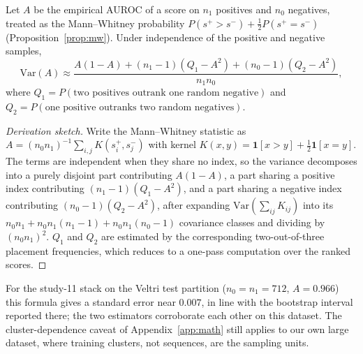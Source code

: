 \begin{proposition}\label{prop:hm}
Let $A$ be the empirical AUROC of a score on $n_1$ positives and $n_0$
negatives, treated as the Mann--Whitney probability
$P(s^{+} > s^{-}) + \tfrac12 P(s^{+} = s^{-})$
(Proposition~\ref{prop:mw}). Under independence of the positive and
negative samples,
\begin{equation}
\mathrm{Var}(A) \approx
\frac{A(1-A) + (n_1 - 1)(Q_1 - A^2) + (n_0 - 1)(Q_2 - A^2)}{n_1 n_0},
\label{eq:hmvar}
\end{equation}
where $Q_1 = P(\text{two positives outrank one random negative})$ and
$Q_2 = P(\text{one positive outranks two random negatives})$.
\end{proposition}
\begin{proof}[Derivation sketch]
Write the Mann--Whitney statistic as
$A = (n_0 n_1)^{-1}\sum_{i,j} K(s_i^{+}, s_j^{-})$ with kernel
$K(x,y) = \mathbf 1[x>y] + \tfrac12 \mathbf 1[x=y]$. The terms are
independent when they share no index, so the variance decomposes into a
purely disjoint part contributing $A(1-A)$, a part sharing a positive
index contributing $(n_1-1)(Q_1 - A^2)$, and a part sharing a negative
index contributing $(n_0-1)(Q_2 - A^2)$, after expanding
$\mathrm{Var}(\sum_{ij} K_{ij})$ into its $n_0n_1 + n_0n_1(n_1-1) +
n_0n_1(n_0-1)$ covariance classes and dividing by $(n_0n_1)^2$.
$Q_1$ and $Q_2$ are estimated by the corresponding two-out-of-three
placement frequencies, which reduces to a one-pass computation over the
ranked scores.
\end{proof}

\begin{remark}
For the study-11 stack on the Veltri test partition ($n_0 = n_1 = 712$,
$A = 0.966$) this formula gives a standard error near $0.007$, in line
with the bootstrap interval reported there; the two estimators corroborate
each other on this dataset. The cluster-dependence caveat of
Appendix~\ref{app:math} still applies to our own large dataset, where
training clusters, not sequences, are the sampling units.
\end{remark}

